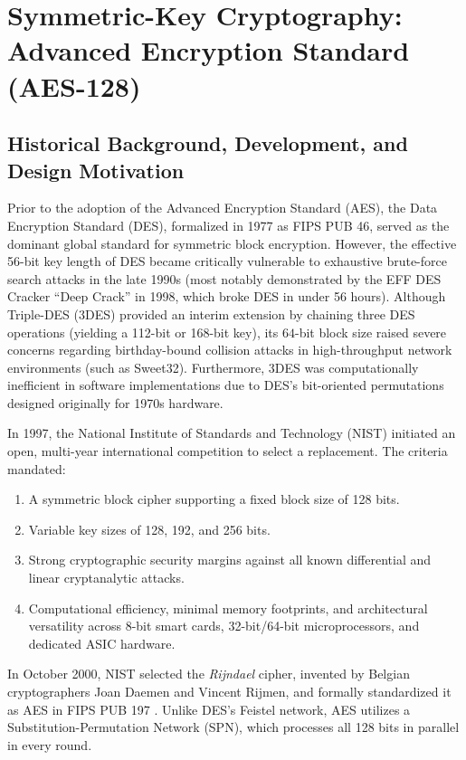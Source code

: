 \chapter{Symmetric-Key Cryptography: Advanced Encryption Standard (AES-128)}
\label{ch:aes}

\section{Historical Background, Development, and Design Motivation}
Prior to the adoption of the Advanced Encryption Standard (AES), the Data Encryption Standard (DES), formalized in 1977 as FIPS PUB 46, served as the dominant global standard for symmetric block encryption. However, the effective 56-bit key length of DES became critically vulnerable to exhaustive brute-force search attacks in the late 1990s (most notably demonstrated by the EFF DES Cracker ``Deep Crack'' in 1998, which broke DES in under 56 hours). Although Triple-DES (3DES) provided an interim extension by chaining three DES operations (yielding a 112-bit or 168-bit key), its $64$-bit block size raised severe concerns regarding birthday-bound collision attacks in high-throughput network environments (such as Sweet32). Furthermore, 3DES was computationally inefficient in software implementations due to DES's bit-oriented permutations designed originally for 1970s hardware.

In 1997, the National Institute of Standards and Technology (NIST) initiated an open, multi-year international competition to select a replacement. The criteria mandated:
\begin{enumerate}
    \item A symmetric block cipher supporting a fixed block size of 128 bits.
    \item Variable key sizes of 128, 192, and 256 bits.
    \item Strong cryptographic security margins against all known differential and linear cryptanalytic attacks.
    \item Computational efficiency, minimal memory footprints, and architectural versatility across 8-bit smart cards, 32-bit/64-bit microprocessors, and dedicated ASIC hardware.
\end{enumerate}
In October 2000, NIST selected the \emph{Rijndael} cipher, invented by Belgian cryptographers Joan Daemen and Vincent Rijmen, and formally standardized it as AES in FIPS PUB 197 \cite{fips197}. Unlike DES's Feistel network, AES utilizes a Substitution-Permutation Network (SPN), which processes all 128 bits in parallel in every round.

